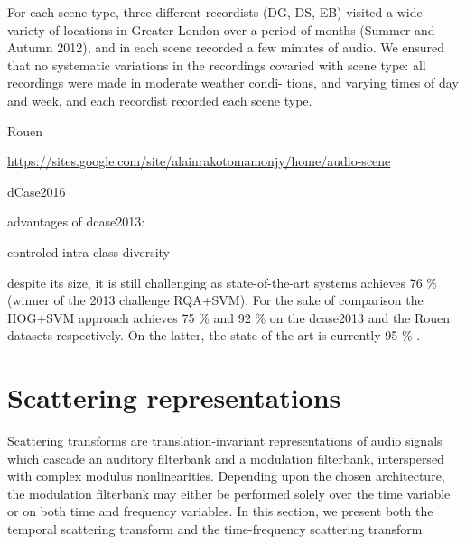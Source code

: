 \documentclass[journal]{IEEEtran}
\begin{document}
For each scene type, three different recordists (DG, DS,
EB) visited a wide variety of locations in Greater London over
a period of months (Summer and Autumn 2012), and in each
scene recorded a few minutes of audio. We ensured that no
systematic variations in the recordings covaried with scene
type: all recordings were made in moderate weather condi-
tions, and varying times of day and week, and each recordist
recorded each scene type.

Rouen \cite{rakotomamonjy2015histogram}

\url{https://sites.google.com/site/alainrakotomamonjy/home/audio-scene}

dCase2016 \cite{Mesaros2016_EUSIPCO}

advantages of dcase2013:

controled intra class diversity

despite its size, it is still challenging as state-of-the-art systems achieves 76 \% \cite{roma2013} (winner of the 2013 challenge RQA+SVM). For the sake of comparison the HOG+SVM approach \cite{rakotomamonjy2015histogram} achieves 75 \% and 92 \% on the dcase2013 and the Rouen datasets respectively. On the latter, the state-of-the-art is currently 95 \% \cite{bisot2016acoustic}.

\section{Scattering representations \label{sec:scattering}}
Scattering transforms are translation-invariant representations of audio signals which cascade an auditory filterbank and a modulation filterbank, interspersed with complex modulus nonlinearities.
Depending upon the chosen architecture, the modulation filterbank may either be performed solely over the time variable or on both time and frequency variables.
In this section, we present both the temporal scattering transform and the time-frequency scattering transform.
\end{document}
